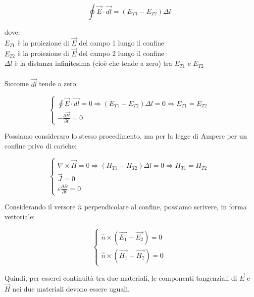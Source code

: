 {\Large \begin{equation}
    \oint \vec{E} \cdot \vec{dl} = (E_{T1} - E_{T2}) \Delta l
\end{equation}}

dove: \\

$E_{T1}$ è la proiezione di $\vec{E}$ del campo 1 lungo il confine \\ 
$E_{T2}$ è la proiezione di $\vec{E}$ del campo 2 lungo il confine \\ 
$\Delta l$ è la distanza infinitesima (cioè che tende a zero) tra $E_{T1}$ e $E_{T2}$ \\ \\ 


Siccome $\vec{dl}$ tende a zero: 

{\Large \begin{equation}
    \begin{cases}
    \oint \vec{E} \cdot \vec{dl} = 0 
    \Rightarrow (E_{T1} - E_{T2}) \Delta l = 0
    \Rightarrow E_{T1} = E_{T2} \\ 
    -\frac{\partial \vec{B}}{\partial t} = 0 
    \end{cases}
\end{equation}}


Possiamo consideraro lo stesso procedimento, ma per la legge di Ampere per un confine privo di cariche: 

{\Large \begin{equation}
    \begin{cases}
        \nabla \times \vec{H} = 0 
        \Rightarrow (H_{T1} - H_{T2}) \Delta l = 0 
        \Rightarrow H_{T1} = H_{T2} \\ 
        \vec{J} = 0 \\ 
        \varepsilon \frac{\partial B}{\partial t} = 0     
    \end{cases}
\end{equation}}

Considerando il versore $\hat{n}$ perpendicolare al confine, possiamo scrivere, in forma vettoriale: 

{\Large \begin{equation}
    \begin{cases}
        \hat{n} \times (\vec{E_1} -\vec{E_2} ) = 0 \\
        \hat{n} \times (\vec{H_1} - \vec{H_2}) = 0 
    \end{cases}
\end{equation}}

Quindi, per esserci continuità tra due materiali, le componenti tangenziali di $\vec{E}$ e $\vec{H}$ 
nei due materiali devono essere uguali. \\ \\ 

